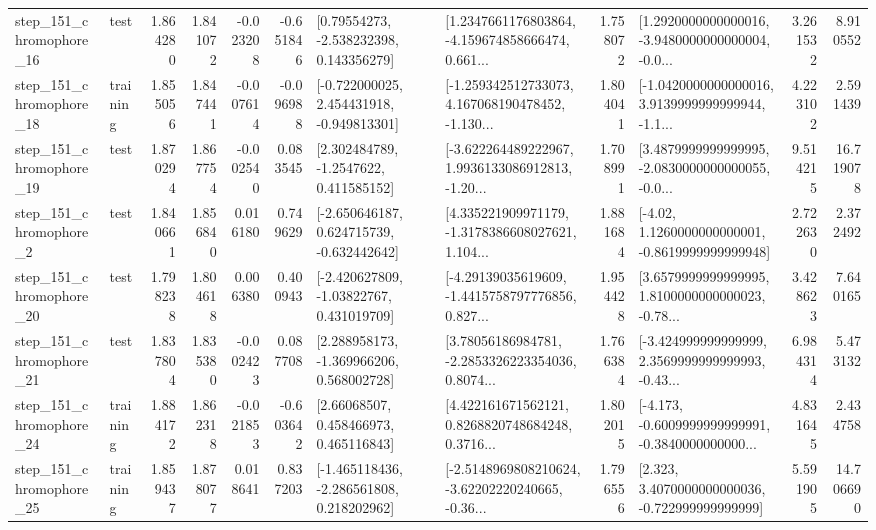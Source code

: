 \begin{tabular}{llrrrrllrlrr}
  step\_151\_chromophore\_16 &      test &      1.864280 &    1.841072 &     -0.023208 & -0.651846 &     [0.79554273, -2.538232398, 0.143356279] &  [1.2347661176803864, -4.159674858666474, 0.661... &       1.758072 &  [1.2920000000000016, -3.9480000000000004, -0.0... &            3.261532 &          8.910552 \\
  step\_151\_chromophore\_18 &  training &      1.855056 &    1.847441 &     -0.007614 & -0.096988 &   [-0.722000025, 2.454431918, -0.949813301] &  [-1.259342512733073, 4.167068190478452, -1.130... &       1.804041 &  [-1.0420000000000016, 3.9139999999999944, -1.1... &            4.223102 &          2.591439 \\
  step\_151\_chromophore\_19 &      test &      1.870294 &    1.867754 &     -0.002540 &  0.083545 &      [2.302484789, -1.2547622, 0.411585152] &  [-3.622264489222967, 1.9936133086912813, -1.20... &       1.708991 &  [3.4879999999999995, -2.0830000000000055, -0.0... &            9.514215 &         16.719078 \\
   step\_151\_chromophore\_2 &      test &      1.840661 &    1.856840 &      0.016180 &  0.749629 &   [-2.650646187, 0.624715739, -0.632442642] &  [4.335221909971179, -1.3178386608027621, 1.104... &       1.881684 &   [-4.02, 1.1260000000000001, -0.8619999999999948] &            2.722630 &          2.372492 \\
  step\_151\_chromophore\_20 &      test &      1.798238 &    1.804618 &      0.006380 &  0.400943 &    [-2.420627809, -1.03822767, 0.431019709] &  [-4.29139035619609, -1.4415758797776856, 0.827... &       1.954428 &  [3.6579999999999995, 1.8100000000000023, -0.78... &            3.428623 &          7.640165 \\
  step\_151\_chromophore\_21 &      test &      1.837804 &    1.835380 &     -0.002423 &  0.087708 &    [2.288958173, -1.369966206, 0.568002728] &  [3.78056186984781, -2.2853326223354036, 0.8074... &       1.766384 &  [-3.424999999999999, 2.3569999999999993, -0.43... &            6.984314 &          5.473132 \\
  step\_151\_chromophore\_24 &  training &      1.884172 &    1.862318 &     -0.021853 & -0.603642 &      [2.66068507, 0.458466973, 0.465116843] &  [4.422161671562121, 0.8268820748684248, 0.3716... &       1.802015 &  [-4.173, -0.6009999999999991, -0.3840000000000... &            4.831645 &          2.434758 \\
  step\_151\_chromophore\_25 &  training &      1.859437 &    1.878077 &      0.018641 &  0.837203 &   [-1.465118436, -2.286561808, 0.218202962] &  [-2.5148969808210624, -3.62202220240665, -0.36... &       1.796556 &    [2.323, 3.4070000000000036, -0.722999999999999] &            5.591905 &         14.706690 \\

\end{tabular}
